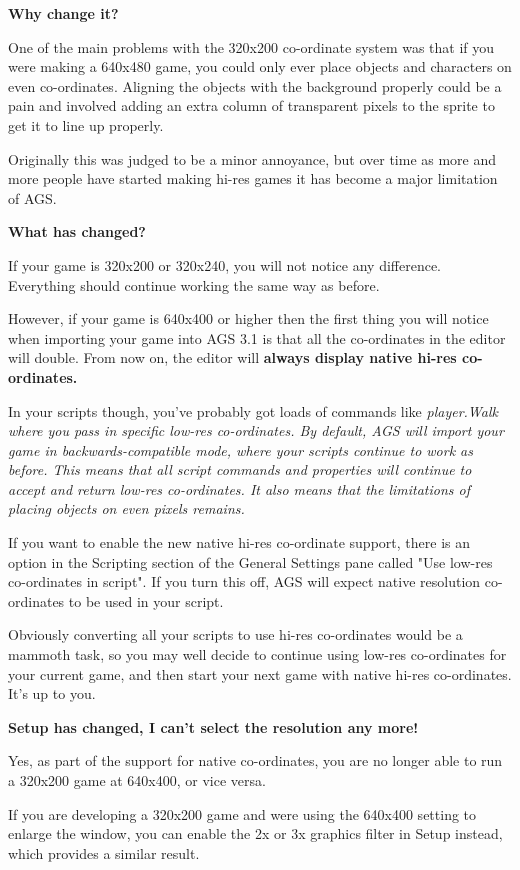 \bf{Why change it?}

One of the main problems with the 320x200 co-ordinate system was that if you were
making a 640x480 game, you could only ever place objects and characters on even
co-ordinates. Aligning the objects with the background properly could be a pain
and involved adding an extra column of transparent pixels to the sprite to get it
to line up properly.

Originally this was judged to be a minor annoyance, but over time as more and more
people have started making hi-res games it has become a major limitation of AGS.

\bf{What has changed?}

If your game is 320x200 or 320x240, you will not notice any difference. Everything
should continue working the same way as before.

However, if your game is 640x400 or higher then the first thing you will notice
when importing your game into AGS 3.1 is that all the co-ordinates in the editor
will double. From now on, the editor will \bf{always} display native hi-res
co-ordinates.

In your scripts though, you've probably got loads of commands like \it{player.Walk} where
you pass in specific low-res co-ordinates. By default, AGS will import your game
in backwards-compatible mode, where your scripts continue to work as before. This
means that all script commands and properties will continue to accept and return
low-res co-ordinates. It also means that the limitations of placing objects on even
pixels remains.

If you want to enable the new native hi-res co-ordinate support, there is an option
in the Scripting section of the General Settings pane called "Use low-res co-ordinates
in script". If you turn this off, AGS will expect native resolution co-ordinates to
be used in your script.

Obviously converting all your scripts to use hi-res co-ordinates would be a mammoth
task, so you may well decide to continue using low-res co-ordinates for your current
game, and then start your next game with native hi-res co-ordinates. It's up to you.

\bf{Setup has changed, I can't select the resolution any more!}

Yes, as part of the support for native co-ordinates, you are no longer able to run
a 320x200 game at 640x400, or vice versa.

If you are developing a 320x200 game and were using the 640x400 setting to enlarge the
window, you can enable the 2x or 3x graphics filter in Setup instead, which provides a
similar result.


